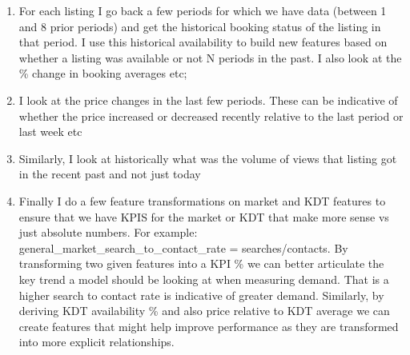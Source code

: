\documentclass[11pt]{article}
\begin{document}
\begin{enumerate}
\def\labelenumi{\arabic{enumi})}
\item
  For each listing I go back a few periods for which we have data
  (between 1 and 8 prior periods) and get the historical booking status
  of the listing in that period. I use this historical availability to
  build new features based on whether a listing was available or not N
  periods in the past. I also look at the \% change in booking averages
  etc;
\item
  I look at the price changes in the last few periods. These can be
  indicative of whether the price increased or decreased recently
  relative to the last period or last week etc
\item
  Similarly, I look at historically what was the volume of views that
  listing got in the recent past and not just today
\item
  Finally I do a few feature transformations on market and KDT features
  to ensure that we have KPIS for the market or KDT that make more sense
  vs just absolute numbers. For example:
  general\_market\_search\_to\_contact\_rate = searches/contacts. By
  transforming two given features into a KPI \% we can better articulate
  the key trend a model should be looking at when measuring demand. That
  is a higher search to contact rate is indicative of greater demand.
  Similarly, by deriving KDT availability \% and also price relative to
  KDT average we can create features that might help improve performance
  as they are transformed into more explicit relationships.
\end{enumerate}
\end{document}
